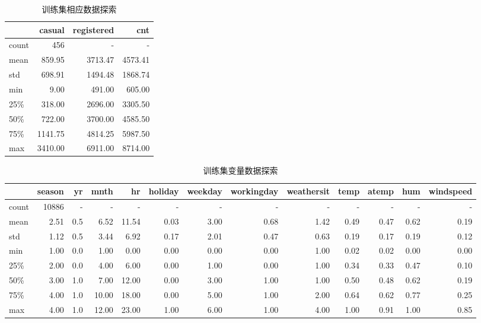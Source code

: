 \begin{table}[htbp]
    \centering\tiny
    \begin{tabular}{lrrr}
    \toprule
    {}    &  casual & registered &  cnt \\
    \midrule
    count &    456  &     -   &     -   \\
    mean  &  859.95 & 3713.47 & 4573.41 \\
    std   &  698.91 & 1494.48 & 1868.74 \\
    min   &    9.00 &  491.00 &  605.00 \\
    25\%  &  318.00 & 2696.00 & 3305.50 \\
    50\%  &  722.00 & 3700.00 & 4585.50 \\
    75\%  & 1141.75 & 4814.25 & 5987.50 \\
    max   & 3410.00 & 6911.00 & 8714.00 \\
    \bottomrule
    \end{tabular}
    \cprotect\caption{训练集相应数据探索}\label{T:train-day_y-data}
\end{table}


\begin{table}[htbp]
    \centering\tiny
    \begin{tabular}{lrrrrrrrrrrrr}
    \toprule
    {}    & season & yr &  mnth & hr & holiday & weekday & workingday & weathersit & temp & atemp & hum & windspeed \\
    \midrule
    count & 10886 &  -  &   -   &    -  &   -  &   -  &   -  &   -  &   -  &   -  &   -  &   -  \\
    mean  &  2.51 & 0.5 &  6.52 & 11.54 & 0.03 & 3.00 & 0.68 & 1.42 & 0.49 & 0.47 & 0.62 & 0.19 \\
    std   &  1.12 & 0.5 &  3.44 &  6.92 & 0.17 & 2.01 & 0.47 & 0.63 & 0.19 & 0.17 & 0.19 & 0.12 \\
    min   &  1.00 & 0.0 &  1.00 &  0.00 & 0.00 & 0.00 & 0.00 & 1.00 & 0.02 & 0.02 & 0.00 & 0.00 \\
    25\%  &  2.00 & 0.0 &  4.00 &  6.00 & 0.00 & 1.00 & 0.00 & 1.00 & 0.34 & 0.33 & 0.47 & 0.10 \\
    50\%  &  3.00 & 1.0 &  7.00 & 12.00 & 0.00 & 3.00 & 1.00 & 1.00 & 0.50 & 0.48 & 0.62 & 0.19 \\
    75\%  &  4.00 & 1.0 & 10.00 & 18.00 & 0.00 & 5.00 & 1.00 & 2.00 & 0.64 & 0.62 & 0.77 & 0.25 \\
    max   &  4.00 & 1.0 & 12.00 & 23.00 & 1.00 & 6.00 & 1.00 & 4.00 & 1.00 & 0.91 & 1.00 & 0.85 \\
    \bottomrule
    \end{tabular}
    \cprotect\caption{训练集变量数据探索}\label{T:train-hour_x-data}
\end{table}

